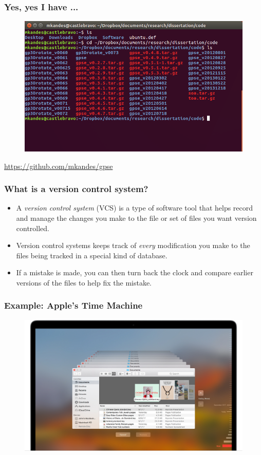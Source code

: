 \documentclass{beamer}
\begin{document}
\begin{frame}
   \frametitle{Yes, yes I have ...}
   \begin{figure}[htbp]
      \includegraphics[width=1.0\textwidth]{images/bad-version-control.png}
   \end{figure}
   \url{https://github.com/mkandes/gpse}
\end{frame}

\begin{frame}
   \frametitle{What is a version control system?}
   \begin{itemize}
      \setlength\itemsep{1.0em}
      \item A \textit{version control system} (VCS) is a type of software 
         tool that helps record and manage the changes you make to the 
         file or set of files you want version controlled.
      \item Version control systems keeps track of \textit{every} 
         modification you make to the files being tracked in a special 
         kind of database.
      \item If a mistake is made, you can then turn back the clock and 
         compare earlier versions of the files to help fix the mistake. 
   \end{itemize}
\end{frame}

\begin{frame}
   \frametitle{Example: Apple's Time Machine}
   \begin{figure}[htbp]
      \includegraphics[width=1.0\textwidth]{images/macos-high-sierra-time-machine-documents.jpg}
   \end{figure}
\end{frame}
\end{document}
